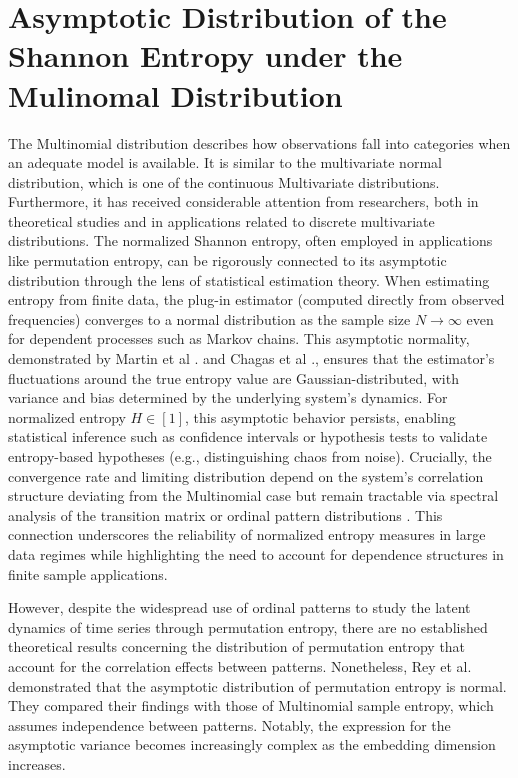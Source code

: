\section {Asymptotic Distribution of the Shannon Entropy under the Mulinomal Distribution}

The Multinomial distribution describes how observations fall into categories when an adequate model is available. It is similar to the multivariate normal distribution, which is one of the continuous Multivariate distributions. Furthermore, it has received considerable attention from researchers, both in theoretical studies and in applications related to discrete multivariate distributions. The normalized Shannon entropy, often employed in applications like permutation entropy, can be rigorously connected to its asymptotic distribution through the lens of statistical estimation theory. When estimating entropy from finite data, the plug-in estimator (computed directly from observed frequencies) converges to a normal distribution as the sample size $N\longrightarrow \infty$ even for dependent processes such as Markov chains. This asymptotic normality, demonstrated by Martin et al \cite{PhysRevE.103.022215}. and Chagas et al \cite{Chagas2022}., ensures that the estimator’s fluctuations around the true entropy value are Gaussian-distributed, with variance and bias determined by the underlying system’s dynamics. For normalized entropy $H \in [1]$, this asymptotic behavior persists, enabling statistical inference such as confidence intervals or hypothesis tests to validate entropy-based hypotheses (e.g., distinguishing chaos from noise). Crucially, the convergence rate and limiting distribution depend on the system’s correlation structure deviating from the Multinomial case but remain tractable via spectral analysis of the transition matrix or ordinal pattern distributions \cite{PhysRevE.103.022215,Chagas2022}. This connection underscores the reliability of normalized entropy measures in large data regimes while highlighting the need to account for dependence structures in finite sample applications.

However, despite the widespread use of ordinal patterns to study the latent dynamics of time series through permutation entropy, there are no established theoretical results concerning the distribution of permutation entropy that account for the correlation effects between patterns. Nonetheless, Rey et al. \cite{Rey2023a} demonstrated that the asymptotic distribution of permutation entropy is normal. They compared their findings with those of Multinomial sample entropy, which assumes independence between patterns. Notably, the expression for the asymptotic variance becomes increasingly complex as the embedding dimension increases. 

